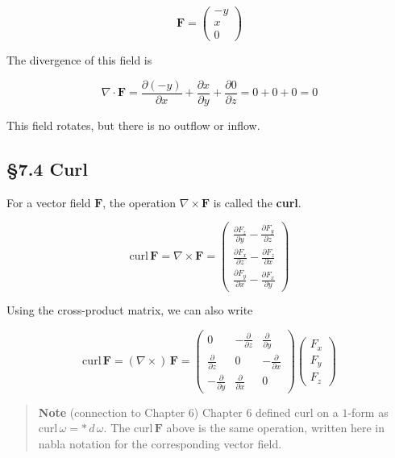 \documentclass[a4paper,12pt,openany]{book}
\begin{document}
\[
\mathbf{F}
=
\begin{pmatrix}
-y\\
x\\
0
\end{pmatrix}
\]

The divergence of this field is

\[\nabla \cdot \mathbf{F} = \frac{\partial (-y)}{\partial x} + \frac{\partial x}{\partial y} + \frac{\partial 0}{\partial z} = 0 + 0 + 0 = 0\]

This field rotates, but there is no outflow or inflow.

\par\vspace{0.35em}\par

\hypertarget{curl}{%
\subsection{§7.4 Curl}\label{curl}}

For a vector field \(\mathbf{F}\), the operation
\(\nabla\times\mathbf{F}\) is called the \textbf{curl}.

\[\mathrm{curl}\,\mathbf{F} = \nabla \times \mathbf{F} = \begin{pmatrix}
\frac{\partial F_z}{\partial y} - \frac{\partial F_y}{\partial z} \\[0.5em]
\frac{\partial F_x}{\partial z} - \frac{\partial F_z}{\partial x} \\[0.5em]
\frac{\partial F_y}{\partial x} - \frac{\partial F_x}{\partial y}
\end{pmatrix}\]

Using the cross-product matrix, we can also write

\[\mathrm{curl}\,\mathbf{F} = (\nabla \times)\,\mathbf{F} = \begin{pmatrix}
0 & -\frac{\partial}{\partial z} & \frac{\partial}{\partial y} \\[0.3em]
\frac{\partial}{\partial z} & 0 & -\frac{\partial}{\partial x} \\[0.3em]
-\frac{\partial}{\partial y} & \frac{\partial}{\partial x} & 0
\end{pmatrix}\begin{pmatrix}
F_x \\ F_y \\ F_z
\end{pmatrix}\]

\begin{quote}
\textbf{Note} (connection to Chapter 6) Chapter 6 defined curl on a
\(1\)-form as \(\mathrm{curl}\,\omega = \ast\,d\,\omega\). The
\(\mathrm{curl}\,\mathbf{F}\) above is the same operation, written here
in nabla notation for the corresponding vector field.
\end{quote}
\end{document}
